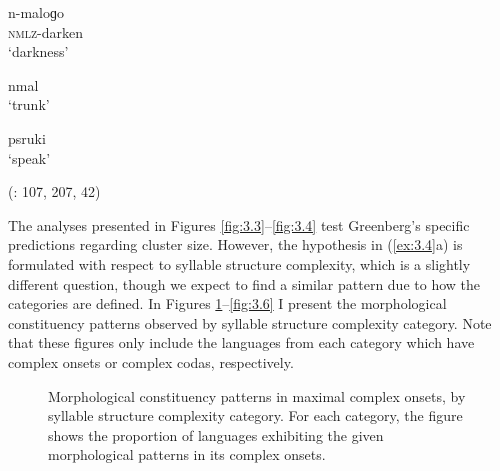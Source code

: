 \ea  n-maloɡo\\
\textsc{nmlz}-darken\\
\glt ‘darkness’

\ex  nmal\\
\glt ‘trunk’

\ex  psruki\\
\glt ‘speak’

(\citealt{Lacrampe2014}: 107, 207, 42)
\z
\z

  The analyses presented in Figures \ref{fig:3.3}--\ref{fig:3.4} test Greenberg’s specific predictions regarding cluster size. However, the hypothesis in (\ref{ex:3.4}a) is formulated with respect to syllable structure complexity, which is a slightly different question, though we expect to find a similar pattern due to how the categories are defined. In Figures \ref{fig:3.5}--\ref{fig:3.6} I present the morphological constituency patterns observed by syllable structure complexity category. Note that these figures only include the languages from each category which have complex onsets or complex codas, respectively.


\begin{figure}
\caption{\label{fig:3.5}Morphological constituency patterns in maximal complex onsets, by syllable structure complexity category. For each category, the figure shows the proportion of languages exhibiting the given morphological patterns in its complex onsets.}
\end{figure}


